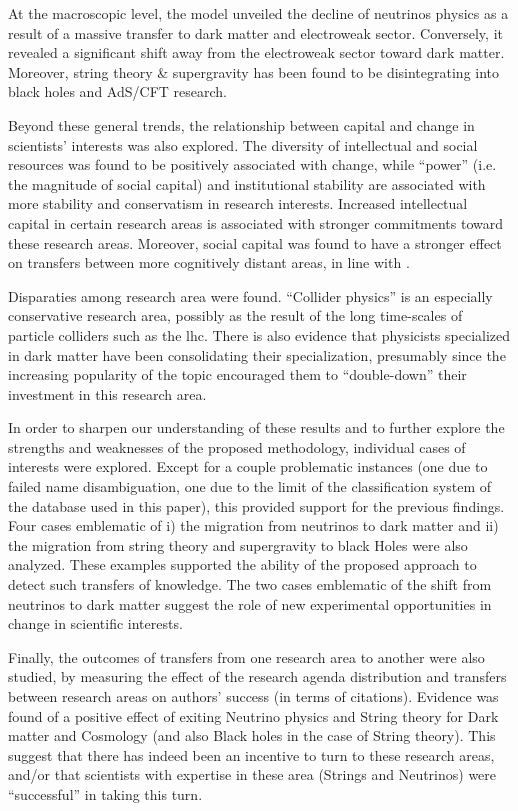 \documentclass{article}
\begin{document}

At the macroscopic level, the model unveiled the decline of neutrinos physics as a result of a massive transfer to dark matter and electroweak sector. Conversely, it revealed a significant shift away from the electroweak sector toward dark matter. Moreover, string theory \& supergravity has been found to be disintegrating into black holes and AdS/CFT research.

Beyond these general trends, the relationship between capital and change in scientists' interests was also explored. The diversity of intellectual and social resources was found to be positively associated with change, while ``power'' (i.e. the magnitude of social capital) and institutional stability are associated with more stability and conservatism in research interests. Increased intellectual capital in certain research areas is associated with stronger commitments toward these research areas. Moreover, social capital was found to have a stronger effect on transfers between more cognitively distant areas, in line with \citealt{Tripodi2020}.

Disparaties among research area were found. ``Collider physics'' is an especially conservative research area, possibly as the result of the long time-scales of particle colliders such as the \gls{lhc}. There is also evidence that physicists specialized in dark matter have been consolidating their specialization, presumably since the increasing popularity of the topic encouraged them to ``double-down'' their investment in this research area.

In order to sharpen our understanding of these results and to further explore the strengths and weaknesses of the proposed methodology, individual cases of interests were explored.  Except for a couple problematic instances (one due to failed name disambiguation, one due to the limit of the classification system of the database used in this paper), this provided support for the previous findings. Four cases emblematic of i) the migration from neutrinos to dark matter and ii) the migration from string theory and supergravity to black Holes were also analyzed. These examples supported the ability of the proposed approach to detect such transfers of knowledge. The two cases emblematic of the shift from neutrinos to dark matter suggest the role of new experimental opportunities in change in scientific interests.

Finally, the outcomes of transfers from one research area to another were also studied, by measuring the effect of the research agenda distribution and transfers between research areas  on authors' success (in terms of citations). Evidence was found of a positive effect of exiting Neutrino physics and String theory for Dark matter and Cosmology (and also Black holes in the case of String theory). This suggest that there has indeed been an incentive to turn to these research areas, and/or that scientists with expertise in these area (Strings and Neutrinos) were ``successful'' in taking this turn.
\end{document}
